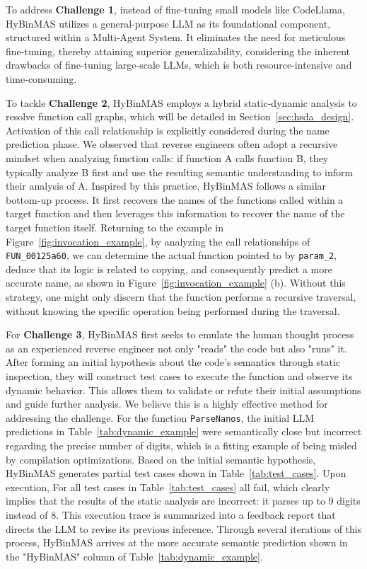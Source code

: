 \documentclass[acmsmall,screen,review,anonymous]{acmart} %
\begin{document}
To address \textbf{Challenge 1}, instead of fine-tuning small models like CodeLlama, HyBinMAS utilizes a general-purpose LLM as its foundational component, structured within a Multi-Agent System. It eliminates the need for meticulous fine-tuning, thereby attaining superior generalizability, considering the inherent drawbacks of fine-tuning large-scale LLMs, which is both resource-intensive and time-consuming\cite{LLaMA}.

To tackle \textbf{Challenge 2}, HyBinMAS employs a hybrid static-dynamic analysis to resolve function call graphs, which will be detailed in Section~\ref{sec:hsda_design}. Activation of this call relationship is explicitly considered during the name prediction phase. We observed that reverse engineers often adopt a recursive mindset when analyzing function calls: if function A calls function B, they typically analyze B first and use the resulting semantic understanding to inform their analysis of A. Inspired by this practice, HyBinMAS follows a similar bottom-up process. It first recovers the names of the functions called within a target function and then leverages this information to recover the name of the target function itself. Returning to the example in Figure~\ref{fig:invocation_example}, by analyzing the call relationships of \lstinline{FUN_00125a60}, we can determine the actual function pointed to by \lstinline{param_2}, deduce that its logic is related to copying, and consequently predict a more accurate name, as shown in Figure~\ref{fig:invocation_example} (b). Without this strategy, one might only discern that the function performs a recursive traversal, without knowing the specific operation being performed during the traversal.

For \textbf{Challenge 3}, HyBinMAS first seeks to emulate the human thought process as an experienced reverse engineer not only "reads" the code but also "runs" it. After forming an initial hypothesis about the code's semantics through static inspection, they will construct test cases to execute the function and observe its dynamic behavior. This allows them to validate or refute their initial assumptions and guide further analysis. We believe this is a highly effective method for addressing the challenge. For the function \lstinline{ParseNanos}, the initial LLM predictions in Table~\ref{tab:dynamic_example} were semantically close but incorrect regarding the precise number of digits, which is a fitting example of being misled by compilation optimizations. Based on the initial semantic hypothesis, HyBinMAS generates partial test cases shown in Table~\ref{tab:test_cases}. Upon execution, For all test cases in Table~\ref{tab:test_cases} all fail, which clearly implies that the results of the static analysis are incorrect: it parses up to 9 digits instead of 8. This execution trace is summarized into a feedback report that directs the LLM to revise its previous inference. Through several iterations of this process, HyBinMAS arrives at the more accurate semantic prediction shown in the "HyBinMAS" column of Table~\ref{tab:dynamic_example}.
\end{document}
